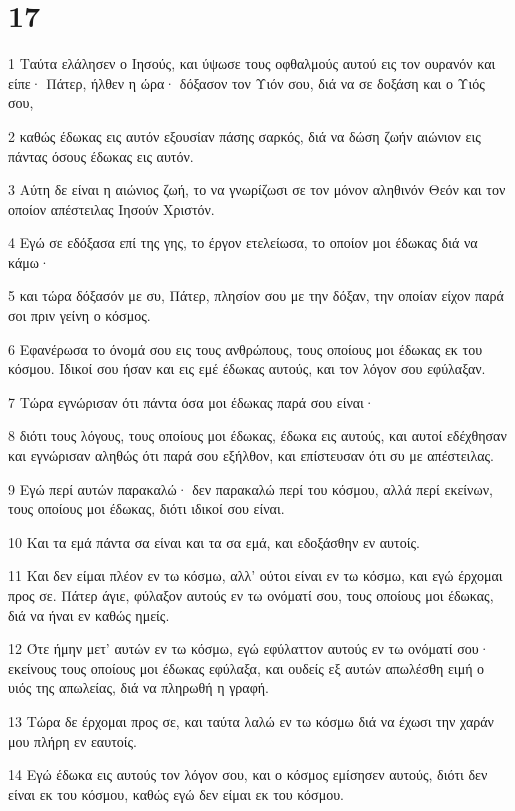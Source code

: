 \chapter{17}

\par 1 Ταύτα ελάλησεν ο Ιησούς, και ύψωσε τους οφθαλμούς αυτού εις τον ουρανόν και είπε· Πάτερ, ήλθεν η ώρα· δόξασον τον Υιόν σου, διά να σε δοξάση και ο Υιός σου,
\par 2 καθώς έδωκας εις αυτόν εξουσίαν πάσης σαρκός, διά να δώση ζωήν αιώνιον εις πάντας όσους έδωκας εις αυτόν.
\par 3 Αύτη δε είναι η αιώνιος ζωή, το να γνωρίζωσι σε τον μόνον αληθινόν Θεόν και τον οποίον απέστειλας Ιησούν Χριστόν.
\par 4 Εγώ σε εδόξασα επί της γης, το έργον ετελείωσα, το οποίον μοι έδωκας διά να κάμω·
\par 5 και τώρα δόξασόν με συ, Πάτερ, πλησίον σου με την δόξαν, την οποίαν είχον παρά σοι πριν γείνη ο κόσμος.
\par 6 Εφανέρωσα το όνομά σου εις τους ανθρώπους, τους οποίους μοι έδωκας εκ του κόσμου. Ιδικοί σου ήσαν και εις εμέ έδωκας αυτούς, και τον λόγον σου εφύλαξαν.
\par 7 Τώρα εγνώρισαν ότι πάντα όσα μοι έδωκας παρά σου είναι·
\par 8 διότι τους λόγους, τους οποίους μοι έδωκας, έδωκα εις αυτούς, και αυτοί εδέχθησαν και εγνώρισαν αληθώς ότι παρά σου εξήλθον, και επίστευσαν ότι συ με απέστειλας.
\par 9 Εγώ περί αυτών παρακαλώ· δεν παρακαλώ περί του κόσμου, αλλά περί εκείνων, τους οποίους μοι έδωκας, διότι ιδικοί σου είναι.
\par 10 Και τα εμά πάντα σα είναι και τα σα εμά, και εδοξάσθην εν αυτοίς.
\par 11 Και δεν είμαι πλέον εν τω κόσμω, αλλ' ούτοι είναι εν τω κόσμω, και εγώ έρχομαι προς σε. Πάτερ άγιε, φύλαξον αυτούς εν τω ονόματί σου, τους οποίους μοι έδωκας, διά να ήναι εν καθώς ημείς.
\par 12 Ότε ήμην μετ' αυτών εν τω κόσμω, εγώ εφύλαττον αυτούς εν τω ονόματί σου· εκείνους τους οποίους μοι έδωκας εφύλαξα, και ουδείς εξ αυτών απωλέσθη ειμή ο υιός της απωλείας, διά να πληρωθή η γραφή.
\par 13 Τώρα δε έρχομαι προς σε, και ταύτα λαλώ εν τω κόσμω διά να έχωσι την χαράν μου πλήρη εν εαυτοίς.
\par 14 Εγώ έδωκα εις αυτούς τον λόγον σου, και ο κόσμος εμίσησεν αυτούς, διότι δεν είναι εκ του κόσμου, καθώς εγώ δεν είμαι εκ του κόσμου.
